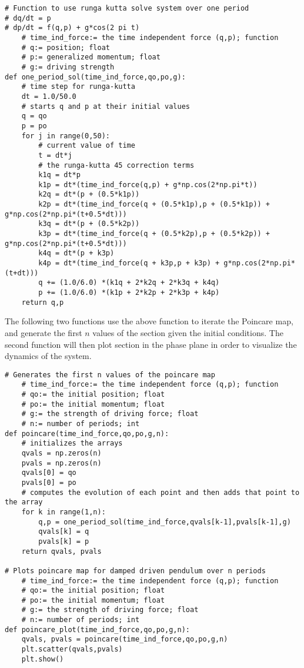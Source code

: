 \documentclass{paper}
\begin{document}
\begin{lstlisting}
# Function to use runga kutta solve system over one period
# dq/dt = p
# dp/dt = f(q,p) + g*cos(2 pi t)
    # time_ind_force:= the time independent force (q,p); function
    # q:= position; float
    # p:= generalized momentum; float
    # g:= driving strength
def one_period_sol(time_ind_force,qo,po,g):
    # time step for runga-kutta
    dt = 1.0/50.0
    # starts q and p at their initial values
    q = qo
    p = po
    for j in range(0,50):
        # current value of time
        t = dt*j
        # the runga-kutta 45 correction terms
        k1q = dt*p
        k1p = dt*(time_ind_force(q,p) + g*np.cos(2*np.pi*t))
        k2q = dt*(p + (0.5*k1p))
        k2p = dt*(time_ind_force(q + (0.5*k1p),p + (0.5*k1p)) + g*np.cos(2*np.pi*(t+0.5*dt)))
        k3q = dt*(p + (0.5*k2p))
        k3p = dt*(time_ind_force(q + (0.5*k2p),p + (0.5*k2p)) + g*np.cos(2*np.pi*(t+0.5*dt)))
        k4q = dt*(p + k3p)
        k4p = dt*(time_ind_force(q + k3p,p + k3p) + g*np.cos(2*np.pi*(t+dt)))
        q += (1.0/6.0) *(k1q + 2*k2q + 2*k3q + k4q)
        p += (1.0/6.0) *(k1p + 2*k2p + 2*k3p + k4p)
    return q,p
\end{lstlisting}
The following two functions use the above function to iterate the Poincare map, and generate the first $n$ values of the section given the initial conditions. The second function will then plot section in the phase plane in order to visualize the dynamics of the system.
\begin{lstlisting}
# Generates the first n values of the poincare map
    # time_ind_force:= the time independent force (q,p); function
    # qo:= the initial position; float
    # po:= the initial momentum; float
    # g:= the strength of driving force; float
    # n:= number of periods; int
def poincare(time_ind_force,qo,po,g,n):
    # initializes the arrays
    qvals = np.zeros(n)
    pvals = np.zeros(n)
    qvals[0] = qo
    pvals[0] = po
    # computes the evolution of each point and then adds that point to the array
    for k in range(1,n):
        q,p = one_period_sol(time_ind_force,qvals[k-1],pvals[k-1],g)
        qvals[k] = q
        pvals[k] = p
    return qvals, pvals

# Plots poincare map for damped driven pendulum over n periods
    # time_ind_force:= the time independent force (q,p); function
    # qo:= the initial position; float
    # po:= the initial momentum; float
    # g:= the strength of driving force; float
    # n:= number of periods; int
def poincare_plot(time_ind_force,qo,po,g,n):
    qvals, pvals = poincare(time_ind_force,qo,po,g,n)
    plt.scatter(qvals,pvals)
    plt.show()
\end{lstlisting}
\end{document}

